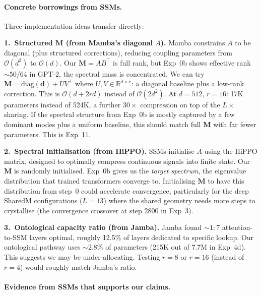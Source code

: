 \documentclass[11pt, a4paper]{article}
\newcommand{\M}{\mathbf{M}}
\theoremstyle{remark}
\begin{document}
\paragraph{Concrete borrowings from SSMs.}

Three implementation ideas transfer directly:

\textbf{1.\ Structured $\M$ (from Mamba's diagonal $A$).}
Mamba constrains $A$ to be diagonal (plus structured corrections), reducing coupling parameters from $\mathcal{O}(d^2)$ to $\mathcal{O}(d)$.
Our $\M = AB^\top$ is full rank, but Exp~0b shows effective rank ${\sim}50/64$ in GPT-2, the spectral mass is concentrated.
We can try $\M = \text{diag}(\mathbf{d}) + UV^\top$ where $U, V \in \mathbb{R}^{d \times r}$: a diagonal baseline plus a low-rank correction.
This is $\mathcal{O}(d + 2rd)$ instead of $\mathcal{O}(2d^2)$.
At $d = 512$, $r = 16$: 17K parameters instead of 524K, a further $30\times$ compression on top of the $L\times$ sharing.
If the spectral structure from Exp~0b is mostly captured by a few dominant modes plus a uniform baseline, this should match full $\M$ with far fewer parameters.
This is Exp~11.

\textbf{2.\ Spectral initialisation (from HiPPO).}
SSMs initialise $A$ using the HiPPO matrix, designed to optimally compress continuous signals into finite state.
Our $\M$ is randomly initialised.
Exp~0b gives us the \emph{target spectrum}, the eigenvalue distribution that trained transformers converge to.
Initialising $\M$ to have this distribution from step~0 could accelerate convergence, particularly for the deep SharedM configurations ($L = 13$) where the shared geometry needs more steps to crystallise (the convergence crossover at step 2800 in Exp~3).

\textbf{3.\ Ontological capacity ratio (from Jamba).}
Jamba found ${\sim}1{:}7$ attention-to-SSM layers optimal, roughly 12.5\% of layers dedicated to specific lookup.
Our ontological pathway uses ${\sim}2.8\%$ of parameters (215K out of 7.7M in Exp~4d).
This suggests we may be under-allocating.
Testing $r = 8$ or $r = 16$ (instead of $r = 4$) would roughly match Jamba's ratio.

\paragraph{Evidence from SSMs that supports our claims.}
\end{document}
